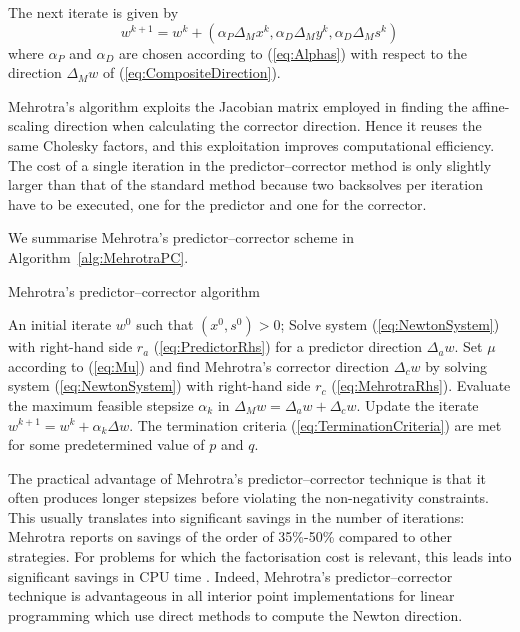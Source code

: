 The next iterate is given by
\[
w^{k+1} = w^k
        + (\alpha_P\Delta_M x^k,\alpha_D\Delta_M y^k,\alpha_D\Delta_M s^k)
\]
where $\alpha_P$ and $\alpha_D$ are chosen according to (\ref{eq:Alphas})
with respect to the direction $\Delta_M w$ of (\ref{eq:CompositeDirection}).

Mehrotra's algorithm exploits the Jacobian matrix employed in 
finding the affine-scaling direction when calculating 
the corrector direction. Hence it reuses the same Cholesky factors,
and this exploitation improves computational efficiency.
The cost of a single iteration in the predictor--corrector 
method is only slightly larger than that of the standard 
method because two backsolves per iteration have to be executed, 
one for the predictor and one for the corrector. 

We summarise Mehrotra's predictor--corrector scheme in
Algorithm~\ref{alg:MehrotraPC}.
\begin{algorithm}[ht]
  \caption{Mehrotra's predictor--corrector algorithm}
    \begin{algorithmic}[0]  \label{alg:MehrotraPC}
      \REQUIRE An initial iterate $w^0$ such that $(x^0, s^0) > 0$;
      \smallskip
      \REPEAT
        \STATE Solve system (\ref{eq:NewtonSystem}) with right-hand side $r_a$
	       (\ref{eq:PredictorRhs}) for a predictor direction $\Delta_a w$.
        \smallskip
        \STATE Set $\mu$ according to (\ref{eq:Mu}) and find Mehrotra's
               corrector direction $\Delta_c w$ by solving system
               (\ref{eq:NewtonSystem}) with right-hand side $r_c$
               (\ref{eq:MehrotraRhs}).
        \smallskip
        \STATE Evaluate the maximum feasible stepsize $\alpha_k$ in
               $\Delta_M w = \Delta_a w + \Delta_c w$.
        \smallskip
        \STATE Update the iterate $w^{k+1} = w^k + \alpha_k\Delta w$.
        \smallskip
      \UNTIL The termination criteria (\ref{eq:TerminationCriteria}) are met
             for some predetermined value of $p$ and $q$.
  \end{algorithmic}
\end{algorithm}

The practical advantage of Mehrotra's predictor--corrector technique
is that it often produces longer stepsizes before violating the 
non-negativity constraints.
%
This usually translates into significant savings in the number of 
iterations: Mehrotra \cite{Mehrotra92} reports on savings of the
order of 35\%-50\% compared to other strategies.
For problems for which the factorisation cost is relevant, this
leads into significant 
savings in CPU time \cite{LustigMarstenShanno,Mehrotra92}. Indeed, 
Mehrotra's predictor--corrector technique is advantageous in all 
interior point implementations for linear programming 
which use direct methods to compute 
the Newton direction.


